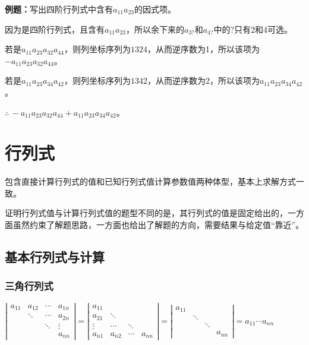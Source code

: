 \documentclass[UTF8, 12pt]{ctexart}
\begin{document}
\textbf{例题：}写出四阶行列式中含有$a_{11}a_{23}$的因式项。

因为是四阶行列式，且含有$a_{11}a_{23}$，所以余下来的$a_{3?}$和$a_{4?}$中的$?$只有2和4可选。

若是$a_{11}a_{23}a_{32}a_{44}$，则列坐标序列为$1324$，从而逆序数为1，所以该项为$-a_{11}a_{23}a_{32}a_{44}$。

若是$a_{11}a_{23}a_{34}a_{42}$，则列坐标序列为$1342$，从而逆序数为2，所以该项为$a_{11}a_{23}a_{34}a_{42}$。

$\therefore\,-a_{11}a_{23}a_{32}a_{44}+a_{11}a_{23}a_{34}a_{42}$。

\section{行列式}

包含直接计算行列式的值和已知行列式值计算参数值两种体型，基本上求解方式一致。

证明行列式值与计算行列式值的题型不同的是，其行列式的值是固定给出的，一方面虽然约束了解题思路，一方面也给出了解题的方向，需要结果与给定值“靠近”。

\subsection{基本行列式与计算}

\subsubsection{三角行列式}

$\left|\begin{array}{cccc} 
    a_{11} & a_{12} & \cdots & a_{1n} \\
     & \ddots & \cdots & a_{2n} \\
     & & \ddots & \vdots  \\
     & & & a_{nn}
\end{array}\right|=
\left|\begin{array}{cccc} 
    a_{11} & & & \\
    a_{21} & \ddots & & \\
    \vdots & \cdots & \ddots &  \\
    a_{n1} & a_{n2} & \cdots & a_{nn}
\end{array}\right|=
\left|\begin{array}{cccc} 
    a_{11} & & & \\
     & \ddots & & \\
     & & \ddots &  \\
     & & & a_{nn}
\end{array}\right|=a_{11}\cdots a_{nn}$
\end{document}
